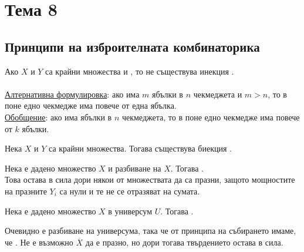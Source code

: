 \section{Тема 8}

\subsection*{Принципи на изброителната комбинаторика}

\begin{principle}[на Дирихле]
    Ако \(X\) и \(Y\) са крайни множества и , то не съществува инекция . \\ \\
    \underline{Алтернативна формулировка}: ако има \(m\) ябълки в \(n\) чекмеджета и \(m > n\), то в поне едно 
    чекмедже има повече от една ябълка. \\
    \underline{Обобщение}: ако има  ябълки в \(n\) чекмеджета, то в поне едно чекмедже има повече 
    от \(k\) ябълки. 
\end{principle}

\begin{principle}[на биекцията]
    Нека \(X\) и \(Y\) са крайни множества. Тогава  \totw съществува биекция .
\end{principle}

\begin{principle}
    Нека е дадено множество \(X\) и разбиване  на \(X\). Тогава 
    . \\

    Това остава в сила дори някои от множествата  да са празни, защото мощностите на 
    празните \(Y_i\) са нули и те не се отразяват на сумата.
\end{principle}

\begin{principle}[на изваждането]
    Нека е дадено множество \(X\) в универсум \(U\). Тогава .

    Очевидно  е разбиване на универсума, така че от принципа на събирането 
    имаме, че .
    Не е възможно \(\overline{X}\) да е празно, но дори тогава твърдението остава в сила.
\end{principle}

